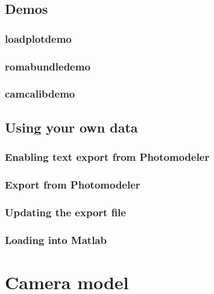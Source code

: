 \documentclass{article}
\begin{document}
\subsection{Demos}

\subsubsection{loadplotdemo}

\subsubsection{romabundledemo}

\subsubsection{camcalibdemo}

\subsection{Using your own data}

\subsubsection{Enabling text export from Photomodeler}

\subsubsection{Export from Photomodeler}

\subsubsection{Updating the export file}

\subsubsection{Loading into Matlab}

\appendix

\section{Camera model}
\end{document}
